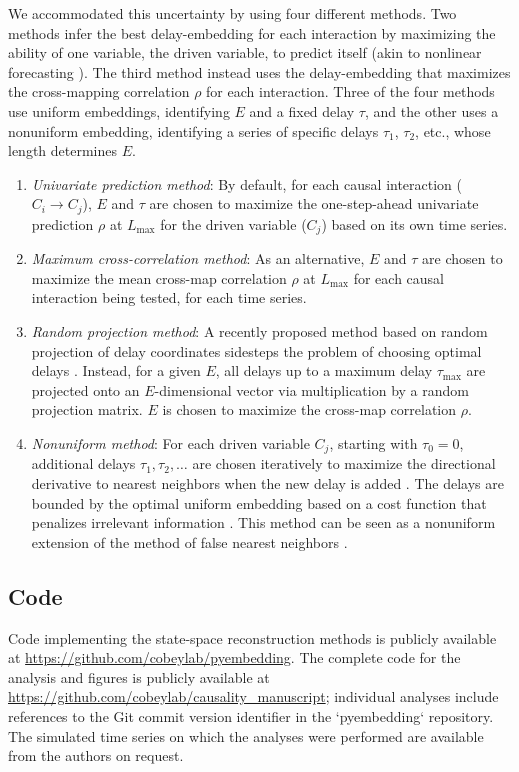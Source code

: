 \documentclass[10pt]{article}
\begin{document}
We accommodated this uncertainty by using four different methods.
Two methods infer the best delay-embedding for each interaction by maximizing the ability of one variable, the driven variable, to predict itself (akin to nonlinear forecasting \cite{Sugihara1990, Sugihara1994}).
The third method instead uses the delay-embedding that maximizes the cross-mapping correlation $\rho$ for each interaction.
Three of the four methods use uniform embeddings, identifying $E$ and a fixed delay $\tau$, and the other uses a nonuniform embedding, identifying a series of specific delays $\tau_1$, $\tau_2$, etc., whose length determines $E$.

\begin{enumerate}
\item \textit{Univariate prediction method}: By default, for each causal interaction ($C_i \rightarrow C_j$), $E$ and $\tau$ are chosen to maximize the one-step-ahead univariate prediction $\rho$ at $L_{\max}$ for the driven variable ($C_j$) based on its own time series.
\item \textit{Maximum cross-correlation method}: As an alternative, $E$ and $\tau$ are chosen to maximize the mean cross-map correlation $\rho$ at $L_\text{max}$ for each causal interaction being tested, for each time series.
\item \textit{Random projection method}: A recently proposed method based on random projection of delay coordinates sidesteps the problem of choosing optimal delays \cite{Tajima2015}. Instead, for a given $E$, all delays up to a maximum delay $\tau_{\max}$ are projected onto an $E$-dimensional vector via multiplication by a random projection matrix. $E$ is chosen to maximize the cross-map correlation $\rho$.
\item \textit{Nonuniform method}: For each driven variable $C_j$, starting with $\tau_0 = 0$, additional delays $\tau_1, \tau_2, \ldots$ are chosen iteratively to maximize the directional derivative to nearest neighbors when the new delay is added \cite{Nichkawde2013}. The delays are bounded by the optimal uniform embedding based on a cost function that penalizes irrelevant information \cite{Uzal2011}. This method can be seen as a nonuniform extension of the method of false nearest neighbors \cite{Kennel1992}.
\end{enumerate}


\subsection{Code}
Code implementing the state-space reconstruction methods is publicly available at \url{https://github.com/cobeylab/pyembedding}.
The complete code for the analysis and figures is publicly available at \url{https://github.com/cobeylab/causality_manuscript}; individual analyses include references to the Git commit version identifier in the `pyembedding` repository.
The simulated time series on which the analyses were performed are available from the authors on request.
\end{document}
